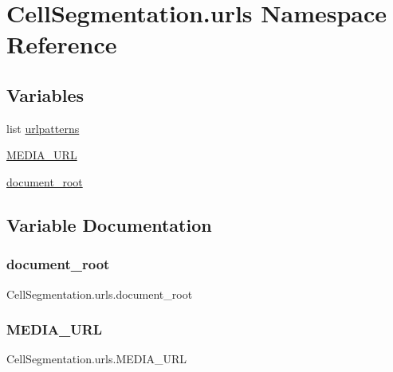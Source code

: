 \hypertarget{namespace_cell_segmentation_1_1urls}{}\section{Cell\+Segmentation.\+urls Namespace Reference}
\label{namespace_cell_segmentation_1_1urls}
\subsection*{Variables}
\begin{DoxyCompactItemize}
\item 
list \mbox{\hyperlink{namespace_cell_segmentation_1_1urls_a0888d3b70d4c1b6c3e6915ac2016a92a}{urlpatterns}}
\item 
\mbox{\hyperlink{namespace_cell_segmentation_1_1urls_ae474fac49d849a497fa92c179ba39c3f}{M\+E\+D\+I\+A\+\_\+\+U\+RL}}
\item 
\mbox{\hyperlink{namespace_cell_segmentation_1_1urls_a58d97fc56a4a4f62dd4c557f0c8ff178}{document\+\_\+root}}
\end{DoxyCompactItemize}


\subsection{Variable Documentation}
\mbox{\label{namespace_cell_segmentation_1_1urls_a58d97fc56a4a4f62dd4c557f0c8ff178}} 
\subsubsection{\texorpdfstring{document\+\_\+root}{document\_root}}
{\footnotesize\ttfamily Cell\+Segmentation.\+urls.\+document\+\_\+root}

\mbox{\label{namespace_cell_segmentation_1_1urls_ae474fac49d849a497fa92c179ba39c3f}} 
\subsubsection{\texorpdfstring{M\+E\+D\+I\+A\+\_\+\+U\+RL}{MEDIA\_URL}}
{\footnotesize\ttfamily Cell\+Segmentation.\+urls.\+M\+E\+D\+I\+A\+\_\+\+U\+RL}

